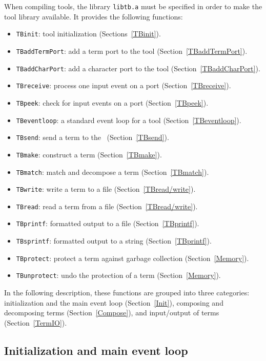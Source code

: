 When compiling tools, the library {\tt libtb.a} must be specified
in order to make the tool library available. It provides the following functions:

\begin{itemize}
\item {\tt TBinit}: tool initialization (Sections~\ref{TBinit}).
\item {\tt TBaddTermPort}: add a term port to the tool (Section~\ref{TBaddTermPort}).
\item {\tt TBaddCharPort}: add a character port to the tool (Section~\ref{TBaddCharPort}).
\item {\tt TBreceive}: process one input event on a port (Section~\ref{TBreceive}).
\item {\tt TBpeek}: check for input events on a port (Section~\ref{TBpeek}).
\item {\tt TBeventloop}: a standard event loop for a tool (Section~\ref{TBeventloop}).
\item {\tt TBsend}: send a term to the \TB\ (Section~\ref{TBsend}).
\item {\tt TBmake}: construct a term (Section~\ref{TBmake}).
\item {\tt TBmatch}: match and decompose a term (Section~\ref{TBmatch}).
\item {\tt TBwrite}: write a term to a file (Section~\ref{TBread/write}).
\item {\tt TBread}: read a term from a file (Section~\ref{TBread/write}).
\item {\tt TBprintf}: formatted output to a file (Section~\ref{TBprintf}).
\item {\tt TBsprintf}: formatted output to a string (Section~\ref{TBprintf}).
\item {\tt TBprotect}: protect a term against garbage collection (Section~\ref{Memory}).
\item {\tt TBunprotect}: undo the protection of a term (Section~\ref{Memory}).


\end{itemize}

In the following description, these functions are grouped into three categories:
initialization and the main event loop (Section~\ref{Init}),
composing and decomposing terms (Section~\ref{Compose}),
and input/output of terms (Section~\ref{TermIO}).


\subsection{\label{Init}Initialization and main event loop}

